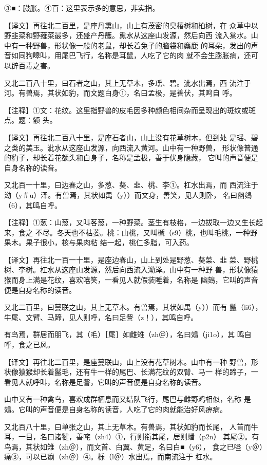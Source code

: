 \documentclass[a4paper,12pt,UTF8,twoside]{ctexbook}
\begin{document}
③■：臌胀。④百：这里表示多的意思，非实指。

【译文】再往北二百里，是座丹熏山，山上有茂密的臭椿树和柏树，在 众草中以野韭菜和野薤菜最多，还盛产丹雘。熏水从这座山发源，然后向西 流入棠水。山中有一种野兽，形状像一般的老鼠，却长着兔子的脑袋和麋鹿 的耳朵，发出的声音如同狗嗥叫，用尾巴飞行，名称是耳鼠，人吃了它的肉 就不会生膨胀病，还可以辟百毒之害。

又北二百八十里，曰石者之山，其上无草木，多瑶、碧。泚水出焉，西 流注于河。有兽焉，其状如豹，而文题白身①，名曰孟极，是善伏，其鸣自 呼。

【注释】①文：花纹。这里指野兽的皮毛因多种颜色相间杂而呈现出的斑纹或斑点。题：额 头。

【译文】再往北二百八十里，是座石者山，山上没有花草树木，但到处 是瑶、碧之类的美玉。泚水从这座山发源，向西流入黄河。山中有一种野兽， 形状像普通的豹子，却长着花额头和白身子，名称是孟极，善于伏身隐藏， 它叫的声音便是自身名称的读音。

又北百一十里，曰边春之山，多葱、葵、韭、桃、李①。杠水出焉，而 西流注于泑（y＃u）泽。有兽焉，其状如禺（y））而文身，善笑，见人则卧， 名曰幽鴳（6），其鸣自呼。

【注释】①葱：山葱，又叫茖葱，一种野菜。茎生有枝格，一边拔取一边又生长起来，食之 不尽。冬天也不枯萎。桃：山桃，又叫榹（s9）桃，也叫毛桃，一种野果木。果子很小，核与果肉粘 结一起，桃仁多脂，可入药。

【译文】再往北一百一十里，是座边春山，山上到处是野葱、葵菜、韭 菜、野桃树、李树。杠水从这座山发源，然后向西流入泑泽。山中有一种野 兽，形状像猿猴而身上满是花纹，喜欢嘻笑，一看见人就假装睡着，名称是 幽鴳，它叫的声音便是自身名称的读音。

又北二百里，曰蔓联之山，其上无草木。有兽焉，其状如禺（y））而有 鬣（li6），牛尾、文臂、马蹄，见人则呼，名曰足訾（z！），其鸣自呼。

有鸟焉，群居而朋飞，其（毛）［尾］如雌雉（zh＠），名曰鵁（ji1o），其 鸣自呼，食之已风。

【译文】再往北二百里，是座蔓联山，山上没有花草树木。山中有一种 野兽，形状像猿猴却长着鬣毛，还有牛一样的尾巴、长满花纹的双臂、马一 样的蹄子，一看见人就呼叫，名称是足訾，它叫的声音便是自身名称的读音。

山中又有一种禽鸟，喜欢成群栖息而又结队飞行，尾巴与雌野鸡相似，名称 是鵁。它叫的声音便是自身名称的读音，人吃了它的肉就能治好风痹病。

又北百八十里，曰单张之山，其上无草木。有兽焉，其状如豹而长尾， 人首而牛耳，一目，名曰诸犍，善咤（zh4）①，行则衔其尾，居则蟠（p2n） 其尾②。有鸟焉，其状如雉（zh＠），而文首、白翼、黄足，名曰白■（y6）， 食之已嗌（y＠）痛③，可以已痸（zh＠）④。栎（l＠）水出焉，而南流注于 杠水。
\end{document}

